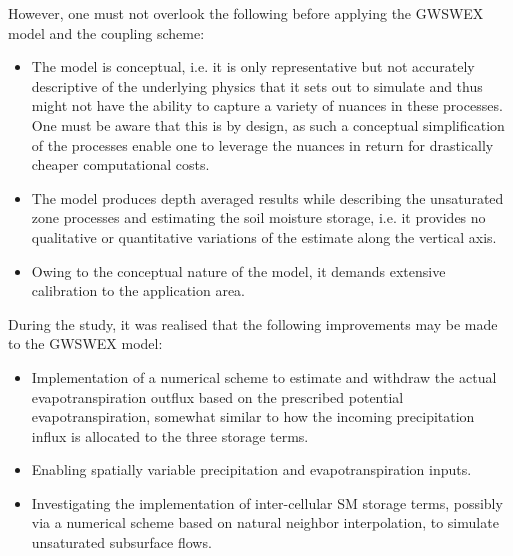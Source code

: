 However, one must not overlook the following before applying the GWSWEX model and the coupling scheme:
\begin{itemize}
    \item The model is conceptual, i.e. it is only representative but not accurately descriptive of the underlying physics that it sets out to simulate and thus might not have the ability to capture a variety of nuances in these processes. One must be aware that this is by design, as such a conceptual simplification of the processes enable one to leverage the nuances in return for drastically cheaper computational costs. 
    \item The model produces depth averaged results while describing the unsaturated zone processes and estimating the soil moisture storage, i.e. it provides no qualitative or quantitative variations of the estimate along the vertical axis.
    \item Owing to the conceptual nature of the model, it demands extensive calibration to the application area.
\end{itemize}

During the study, it was realised that the following improvements may be made to the GWSWEX model:
\begin{itemize}
    \item Implementation of a numerical scheme to estimate and withdraw the actual evapotranspiration outflux based on the prescribed potential evapotranspiration, somewhat similar to how the incoming precipitation influx is allocated to the three storage terms.
    \item Enabling spatially variable precipitation and evapotranspiration inputs.
    \item Investigating the implementation of inter-cellular SM storage terms, possibly via a numerical scheme based on natural neighbor interpolation, to simulate unsaturated subsurface flows.
\end{itemize}


\endinput